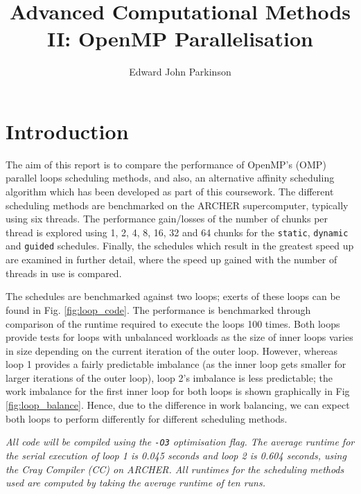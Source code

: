 \documentclass[11pt, a4paper]{article}
\begin{document}
	\title{Advanced Computational Methods II: OpenMP Parallelisation}
	\author{Edward John Parkinson}
	\maketitle	
	
	\section{Introduction}
		The aim of this report is to compare the performance of OpenMP's (OMP) parallel loops scheduling methods, and also, an alternative affinity scheduling algorithm which has been developed as part of this coursework. The different scheduling methods are benchmarked on the ARCHER supercomputer, typically using six threads. The performance gain/losses of the number of chunks per thread is explored using 1, 2, 4, 8, 16, 32 and 64 chunks for the \texttt{static}, \texttt{dynamic} and \texttt{guided}  schedules. Finally, the schedules which result in the greatest speed up are examined in further detail, where the speed up gained with the number of threads in use is compared.
		
		The schedules are benchmarked against two loops; exerts of these loops can be found in Fig. \ref{fig:loop_code}. The performance is benchmarked through comparison of the runtime required to execute the loops 100 times. Both loops provide tests for loops with unbalanced workloads as the size of inner loops varies in size depending on the current iteration of the outer loop. However, whereas loop 1 provides a fairly predictable imbalance (as the inner loop gets smaller for larger iterations of the outer loop), loop 2's imbalance is less predictable; the work imbalance for the first inner loop for both loops is shown graphically in Fig \ref{fig:loop_balance}. Hence, due to the difference in work balancing, we can expect both loops to perform differently for different scheduling methods.
		 
		\textit{All code will be compiled using the \texttt{-O3} optimisation flag. The average runtime for the serial execution of loop 1 is 0.045 seconds and loop 2 is 0.604 seconds, using the Cray Compiler (CC) on ARCHER. All runtimes for the scheduling methods used are computed by taking the average runtime of ten runs.}
\end{document}
